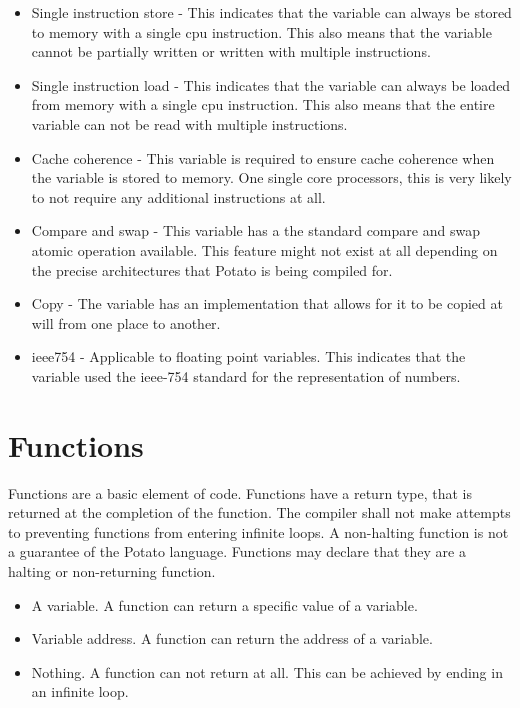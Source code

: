 \documentclass[12pt]{article}
\newcommand{\progLangNameSpace}{Potato }
\begin{document}
\begin{itemize}
\item Single instruction store - This indicates that the variable can always be stored to memory with a single cpu instruction. This also means that the variable cannot be partially written or written with multiple instructions.
\item Single instruction load - This indicates that the variable can always be loaded from memory with a single cpu instruction. This also means that the entire variable can not be read with multiple instructions.
\item Cache coherence - This variable is required to ensure cache coherence when the variable is stored to memory. One single core processors, this is very likely to not require any additional instructions at all.
\item Compare and swap - This variable has a the standard compare and swap atomic operation available. This feature might not exist at all depending on the precise architectures that \progLangNameSpace is being compiled for.
\item Copy - The variable has an implementation that allows for it to be copied at will from one place to another.
\item ieee754 - Applicable to floating point variables. This indicates that the variable used the ieee-754 standard for the representation of numbers.
\end{itemize}

\section{ Functions}

Functions are a basic element of code. Functions have a return type, that is returned at the completion of the function. The compiler shall not make attempts to preventing functions from entering infinite loops. A non-halting function is not a guarantee of the \progLangNameSpace language. Functions may declare that they are a halting or non-returning function.

\begin{itemize}
\item A variable. A function can return a specific value of a variable.
\item Variable address. A function can return the address of a variable.
\item Nothing. A function can not return at all. This can be achieved by ending in an infinite loop.
\end{itemize}
\end{document}
